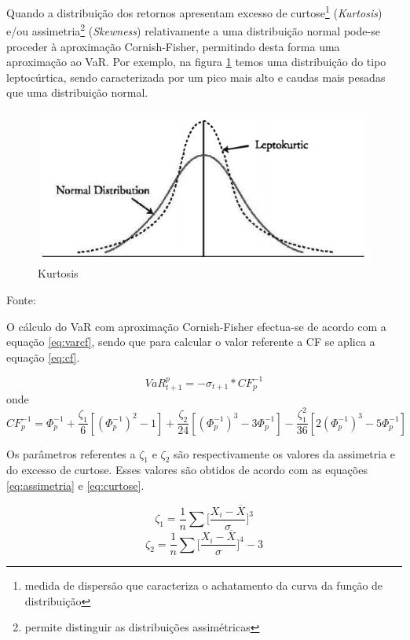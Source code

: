 \documentclass[
  12pt,
  a4paper,
  openany]{book}
\begin{document}
Quando a distribuição dos retornos apresentam excesso de curtose\footnote{medida de dispersão que caracteriza o achatamento da curva da função de distribuição} (\emph{Kurtosis}) e/ou assimetria\footnote{permite distinguir as distribuições assimétricas} (\emph{Skewness}) relativamente a uma distribuição normal pode-se proceder à aproximação Cornish-Fisher, permitindo desta forma uma aproximação ao VaR. Por exemplo, na figura \ref{fig:quant} temos uma distribuição do tipo leptocúrtica, sendo caracterizada por um pico mais alto e caudas mais pesadas que uma distribuição normal.
\bigskip

\begin{figure}

{\centering \includegraphics[width=0.6\linewidth]{image/kurtosis} 

}

\caption{Kurtosis}\label{fig:quant}
\end{figure}
\centering

Fonte: \citep[pp.46]{quant}

\justifying

O cálculo do VaR com aproximação Cornish-Fisher efectua-se de acordo com a equação \eqref{eq:varcf}, sendo que para calcular o valor referente a CF se aplica a equação \eqref{eq:cf}.

\begin{equation} 
  VaR_{t+1}^{p} = -\sigma_{t+1}*CF_{p}^{-1}
  \label{eq:varcf}
\end{equation}
onde
\begin{equation} 
  CF_{p}^{-1} = \Phi_{p}^{-1} + \frac{\zeta_{1}}{6}[(\Phi_{p}^{-1})^2-1] + \frac{\zeta_{2}}{24}[(\Phi_{p}^{-1})^3-3\Phi_{p}^{-1}] - \frac{\zeta_{1}^{2}}{36}[2(\Phi_{p}^{-1})^3-5\Phi_{p}^{-1}]
  \label{eq:cf}
\end{equation}

Os parâmetros referentes a \(\zeta_1\) e \(\zeta_2\) são respectivamente os valores da assimetria e do excesso de curtose. Esses valores são obtidos de acordo com as equações \eqref{eq:assimetria} e \eqref{eq:curtose}.

\begin{equation} 
 \zeta_1 = \frac{1}{n}\sum\bigg[\frac{X_i - \overline{X}}{\sigma}\bigg]^3
  \label{eq:assimetria}
\end{equation}
\begin{equation} 
 \zeta_2 = \frac{1}{n}\sum\bigg[\frac{X_i - \overline{X}}{\sigma}\bigg]^4 - 3
  \label{eq:curtose}
\end{equation}
\end{document}
